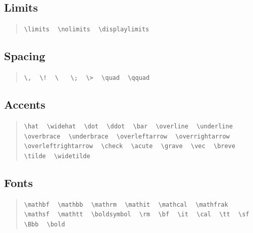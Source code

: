 \documentclass{article}
\newcommand{\texcommand}[1]{\textbackslash{}#1}
\newcommand{\spacer}{\,\,\, \hfil}
\newcommand{\lastspacer}{\hfill\hfill\hfill}
\newenvironment{mylist}{\begin{quote}}{\end{quote}}
\begin{document}
\subsection{Limits}

\begin{mylist}
\texttt{\texcommand{limits}} \spacer
\texttt{\texcommand{nolimits}} \spacer
\texttt{\texcommand{displaylimits}} \lastspacer
\end{mylist}

\subsection{Spacing}

\begin{mylist}
\texttt{\texcommand{,}} \spacer
\texttt{\texcommand{!}} \spacer
\texttt{\texcommand{ }} \spacer
\texttt{\texcommand{;}} \spacer
\texttt{\texcommand{>}} \spacer
\texttt{\texcommand{quad}} \spacer
\texttt{\texcommand{qquad}} \lastspacer
\end{mylist}

\subsection{Accents}

\begin{mylist}
\texttt{\texcommand{hat}} \spacer
\texttt{\texcommand{widehat}} \spacer
\texttt{\texcommand{dot}} \spacer
\texttt{\texcommand{ddot}} \spacer
\texttt{\texcommand{bar}} \spacer
\texttt{\texcommand{overline}} \spacer
\texttt{\texcommand{underline}} \spacer
\texttt{\texcommand{overbrace}} \spacer
\texttt{\texcommand{underbrace}} \spacer
\texttt{\texcommand{overleftarrow}} \spacer
\texttt{\texcommand{overrightarrow}} \spacer
\texttt{\texcommand{overleftrightarrow}} \spacer
\texttt{\texcommand{check}} \spacer
\texttt{\texcommand{acute}} \spacer
\texttt{\texcommand{grave}} \spacer
\texttt{\texcommand{vec}} \spacer
\texttt{\texcommand{breve}} \spacer
\texttt{\texcommand{tilde}} \spacer
\texttt{\texcommand{widetilde}} \lastspacer
\end{mylist}

\subsection{Fonts}

\begin{mylist}
\texttt{\texcommand{mathbf}} \spacer
\texttt{\texcommand{mathbb}} \spacer
\texttt{\texcommand{mathrm}} \spacer
\texttt{\texcommand{mathit}} \spacer
\texttt{\texcommand{mathcal}} \spacer
\texttt{\texcommand{mathfrak}} \spacer
\texttt{\texcommand{mathsf}} \spacer
\texttt{\texcommand{mathtt}} \spacer
\texttt{\texcommand{boldsymbol}} \spacer
\texttt{\texcommand{rm}} \spacer
\texttt{\texcommand{bf}} \spacer
\texttt{\texcommand{it}} \spacer
\texttt{\texcommand{cal}} \spacer
\texttt{\texcommand{tt}} \spacer
\texttt{\texcommand{sf}} \spacer
\texttt{\texcommand{Bbb}} \spacer
\texttt{\texcommand{bold}} \lastspacer
\end{mylist}
\end{document}
